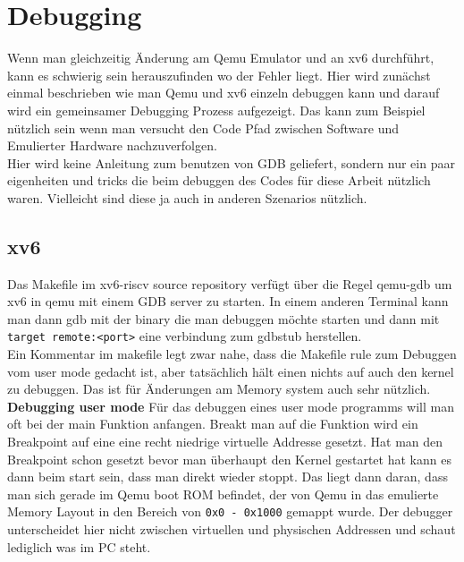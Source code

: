 \section{Debugging}
Wenn man gleichzeitig Änderung am Qemu Emulator und an xv6 durchführt, kann es schwierig sein
herauszufinden wo der Fehler liegt. Hier wird zunächst einmal beschrieben wie man Qemu und
xv6 einzeln debuggen kann und darauf wird ein gemeinsamer Debugging Prozess aufgezeigt.
Das kann zum Beispiel nützlich sein wenn man versucht den Code Pfad zwischen Software und
Emulierter Hardware nachzuverfolgen.\\
Hier wird keine Anleitung zum benutzen von GDB geliefert, sondern nur ein paar eigenheiten
und tricks die beim debuggen des Codes für diese Arbeit nützlich waren. Vielleicht sind
diese ja auch in anderen Szenarios nützlich.


\subsection{xv6}
Das Makefile im xv6-riscv source repository verfügt über die Regel qemu-gdb um xv6 in qemu
mit einem GDB server zu starten. In einem anderen Terminal kann man dann gdb mit der binary
die man debuggen möchte starten und dann mit \texttt{target remote:<port>} eine verbindung
zum gdbstub herstellen.\\
Ein Kommentar im makefile legt zwar nahe, dass die Makefile rule zum Debuggen vom user mode
gedacht ist, aber tatsächlich hält einen nichts auf auch den kernel zu debuggen. Das ist
für Änderungen am Memory system auch sehr nützlich.\\
\textbf{Debugging user mode} Für das debuggen eines user mode programms will man oft bei
der main Funktion anfangen. Breakt man auf die Funktion wird ein Breakpoint auf eine eine recht
niedrige virtuelle Addresse gesetzt. Hat man den Breakpoint schon gesetzt bevor man überhaupt
den Kernel gestartet hat kann es dann beim start sein, dass man direkt wieder stoppt.
Das liegt dann daran, dass man sich gerade im Qemu boot ROM befindet, der von Qemu in
das emulierte Memory Layout in den Bereich von \texttt{0x0 - 0x1000} gemappt wurde.
Der debugger unterscheidet hier nicht zwischen virtuellen und physischen Addressen und
schaut lediglich was im PC steht.

